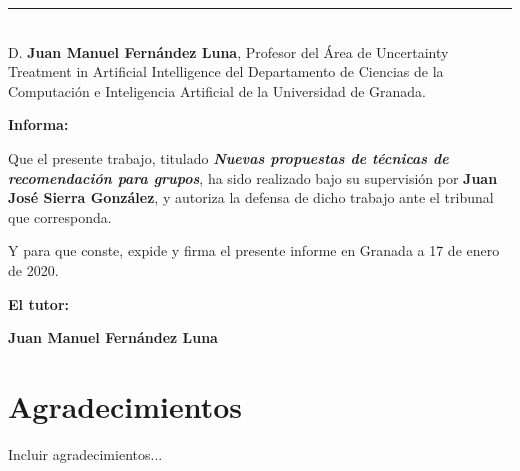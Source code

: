 \noindent\rule[-1ex]{\textwidth}{2pt}\\[4.5ex]

D. \textbf{Juan Manuel Fernández Luna}, Profesor del Área de Uncertainty Treatment in Artificial Intelligence del Departamento de Ciencias de la Computación e Inteligencia Artificial de la Universidad de Granada.

\vspace{0.5cm}

\textbf{Informa:}

\vspace{0.5cm}

Que el presente trabajo, titulado \textit{\textbf{Nuevas propuestas de técnicas de recomendación para grupos}},
ha sido realizado bajo su supervisión por \textbf{Juan José Sierra González}, y autoriza la defensa de dicho trabajo ante el tribunal
que corresponda.

\vspace{0.5cm}

Y para que conste, expide y firma el presente informe en Granada a 17 de enero de 2020.

\vspace{1cm}

\textbf{El tutor:}

\vspace{5cm}

\noindent \textbf{Juan Manuel Fernández Luna}

\chapter*{Agradecimientos}
\thispagestyle{empty}

\vspace{1cm}

Incluir agradecimientos...